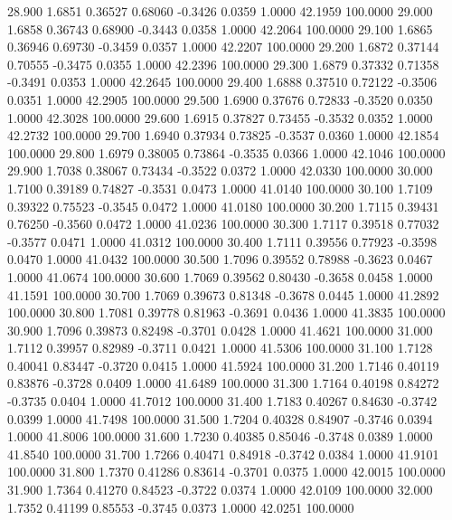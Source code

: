   28.900   1.6851   0.36527   0.68060  -0.3426   0.0359   1.0000  42.1959 100.0000
  29.000   1.6858   0.36743   0.68900  -0.3443   0.0358   1.0000  42.2064 100.0000
  29.100   1.6865   0.36946   0.69730  -0.3459   0.0357   1.0000  42.2207 100.0000
  29.200   1.6872   0.37144   0.70555  -0.3475   0.0355   1.0000  42.2396 100.0000
  29.300   1.6879   0.37332   0.71358  -0.3491   0.0353   1.0000  42.2645 100.0000
  29.400   1.6888   0.37510   0.72122  -0.3506   0.0351   1.0000  42.2905 100.0000
  29.500   1.6900   0.37676   0.72833  -0.3520   0.0350   1.0000  42.3028 100.0000
  29.600   1.6915   0.37827   0.73455  -0.3532   0.0352   1.0000  42.2732 100.0000
  29.700   1.6940   0.37934   0.73825  -0.3537   0.0360   1.0000  42.1854 100.0000
  29.800   1.6979   0.38005   0.73864  -0.3535   0.0366   1.0000  42.1046 100.0000
  29.900   1.7038   0.38067   0.73434  -0.3522   0.0372   1.0000  42.0330 100.0000
  30.000   1.7100   0.39189   0.74827  -0.3531   0.0473   1.0000  41.0140 100.0000
  30.100   1.7109   0.39322   0.75523  -0.3545   0.0472   1.0000  41.0180 100.0000
  30.200   1.7115   0.39431   0.76250  -0.3560   0.0472   1.0000  41.0236 100.0000
  30.300   1.7117   0.39518   0.77032  -0.3577   0.0471   1.0000  41.0312 100.0000
  30.400   1.7111   0.39556   0.77923  -0.3598   0.0470   1.0000  41.0432 100.0000
  30.500   1.7096   0.39552   0.78988  -0.3623   0.0467   1.0000  41.0674 100.0000
  30.600   1.7069   0.39562   0.80430  -0.3658   0.0458   1.0000  41.1591 100.0000
  30.700   1.7069   0.39673   0.81348  -0.3678   0.0445   1.0000  41.2892 100.0000
  30.800   1.7081   0.39778   0.81963  -0.3691   0.0436   1.0000  41.3835 100.0000
  30.900   1.7096   0.39873   0.82498  -0.3701   0.0428   1.0000  41.4621 100.0000
  31.000   1.7112   0.39957   0.82989  -0.3711   0.0421   1.0000  41.5306 100.0000
  31.100   1.7128   0.40041   0.83447  -0.3720   0.0415   1.0000  41.5924 100.0000
  31.200   1.7146   0.40119   0.83876  -0.3728   0.0409   1.0000  41.6489 100.0000
  31.300   1.7164   0.40198   0.84272  -0.3735   0.0404   1.0000  41.7012 100.0000
  31.400   1.7183   0.40267   0.84630  -0.3742   0.0399   1.0000  41.7498 100.0000
  31.500   1.7204   0.40328   0.84907  -0.3746   0.0394   1.0000  41.8006 100.0000
  31.600   1.7230   0.40385   0.85046  -0.3748   0.0389   1.0000  41.8540 100.0000
  31.700   1.7266   0.40471   0.84918  -0.3742   0.0384   1.0000  41.9101 100.0000
  31.800   1.7370   0.41286   0.83614  -0.3701   0.0375   1.0000  42.0015 100.0000
  31.900   1.7364   0.41270   0.84523  -0.3722   0.0374   1.0000  42.0109 100.0000
  32.000   1.7352   0.41199   0.85553  -0.3745   0.0373   1.0000  42.0251 100.0000
